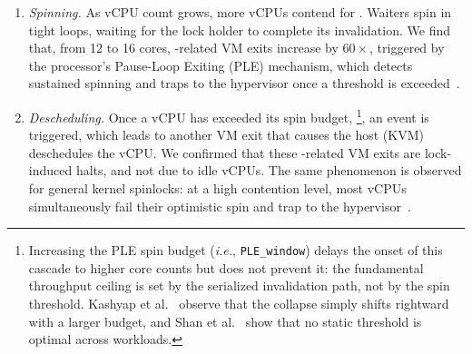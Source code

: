 \begin{enumerate}[leftmargin=*]
\item {\it Spinning.}
  As vCPU count grows, more vCPUs contend for .
  Waiters spin in tight  loops, waiting for the lock holder to complete its invalidation.
  We find that, from 12 to 16 cores,
  -related VM exits
  increase by {$60\times$}, triggered by the processor's Pause-Loop Exiting (PLE) mechanism,
  which detects sustained spinning and traps to the
  hypervisor once a threshold is exceeded~\cite{Shan2017apples}.
\item \textit{Descheduling.}
  Once a vCPU has exceeded its spin budget,
  \footnote{Increasing the 
  PLE spin budget (\textit{i.e.}, \texttt{PLE\_window}) 
  delays the onset of this cascade to higher core counts 
  but does not prevent it: the fundamental throughput ceiling 
  is set by the serialized invalidation path, not by the 
  spin threshold.
  Kashyap et al.~\cite{Kashyap2016oppspinlocks} observe that 
  the collapse simply shifts rightward with a larger budget, 
  and Shan et al.~\cite{Shan2017apples} show that 
  no static threshold is optimal across workloads.},
\fi
  an  event is triggered, which leads to another VM exit that causes
  the host (KVM) deschedules the vCPU.
  We confirmed that these -related VM exits are lock-induced halts, and not due to idle vCPUs. 
  The same phenomenon is observed for general kernel spinlocks:
  at a high contention level, most vCPUs
  simultaneously fail their optimistic spin
  and trap to the hypervisor~\cite{Kashyap2016oppspinlocks}.

  
  



\end{enumerate}
